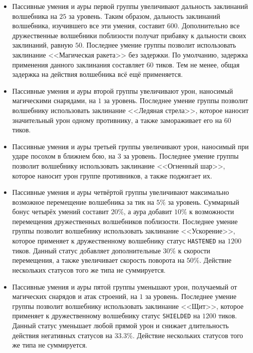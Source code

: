 \begin{itemize}
    \item Пассивные умения и ауры первой группы увеличивают дальность заклинаний волшебника на $25$ за уровень. Таким образом, дальность
          заклинаний волшебника, изучившего все эти умения, составит $600$. Дополнительно все дружественные волшебники поблизости получат
          прибавку к дальности своих заклинаний, равную $50$. Последнее умение группы позволит использовать заклинание <<Магическая ракета>>
          без задержки. По умолчанию, задержка применения данного заклинания составляет $60$ тиков. Тем не менее, общая задержка на действия
          волшебника всё ещё применяется.
    \item Пассивные умения и ауры второй группы увеличивают урон, наносимый магическими снарядами, на $1$ за уровень. Последнее умение
          группы позволит волшебнику использовать заклинание <<Ледяная стрела>>, которое наносит значительный урон одному противнику, а
          также замораживает его на $60$ тиков.
    \item Пассивные умения и ауры третьей группы увеличивают урон, наносимый при ударе посохом в ближнем бою, на $3$ за уровень. Последнее
          умение группы позволит волшебнику использовать заклинание <<Огненный шар>>, которое наносит урон группе противников, а также
          поджигает их.
    \item Пассивные умения и ауры четвёртой группы увеличивают максимально возможное перемещение волшебника за тик на $5\%$ за уровень.
          Суммарный бонус четырёх умений составит $20\%$, а аура добавит $10\%$ к возможности перемещения дружественных волшебников
          поблизости. Последнее умение группы позволит волшебнику использовать заклинание <<Ускорение>>, которое применяет к дружественному
          волшебнику статус \texttt{HASTENED} на $1200$ тиков. Данный статус добавляет дополнительные $30\%$ к скорости перемещения, а также
          увеличивает скорость поворота на $50\%$. Действие нескольких статусов того же типа не суммируется.
    \item Пассивные умения и ауры пятой группы уменьшают урон, получаемый от магических снарядов и атак строений, на $1$ за уровень.
          Последнее умение группы позволит волшебнику использовать заклинание <<Щит>>, которое применяет к дружественному волшебнику статус
          \texttt{SHIELDED} на $1200$ тиков. Данный статус уменьшает любой прямой урон и снижает длительность действия негативных статусов
          на $33.3\%$. Действие нескольких статусов того же типа не суммируется.
\end{itemize}

